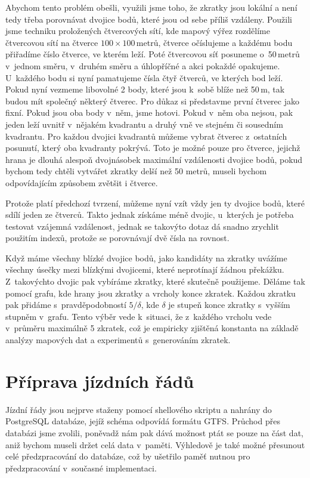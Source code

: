 Abychom tento problém obešli, využili jsme toho, že zkratky jsou lokální a není
tedy třeba porovnávat dvojice bodů, které jsou od sebe příliš vzdáleny. Použili
jsme techniku proložených čtvercových sítí, kde mapový výřez rozdělíme
čtvercovou sítí na čtverce $100\times100$\,metrů, čtverce očíslujeme a každému
bodu přiřadíme číslo čtverce, ve kterém leží. Poté čtvercovou síť posuneme
o~50\,metrů v~jednom směru, v~druhém směru a úhlopříčné a akci pokaždé opakujeme.
U~každého bodu si nyní pamatujeme čísla čtyř čtverců, ve kterých bod leží. 
Pokud nyní vezmeme libovolné 2 body, které jsou k~sobě blíže než 50\,m, tak
budou mít společný některý čtverec. Pro důkaz si představme první čtverec jako
fixní. Pokud jsou oba body v~něm, jsme hotovi. Pokud v~něm oba nejsou, pak jeden
leží uvnitř v~nějakém kvadrantu a druhý vně ve stejném či sousedním kvadrantu.
Pro každou dvojici kvadrantů můžeme vybrat čtverec z~ostatních posunutí, který
oba kvadranty pokrývá. Toto je možné pouze pro čtverce, jejichž hrana je dlouhá
alespoň dvojnásobek maximální vzdálenosti dvojice bodů, pokud bychom tedy chtěli
vytvářet zkratky delší než 50 metrů, museli bychom odpovídajícím způsobem
zvětšit i čtverce.

Protože platí předchozí tvrzení, můžeme nyní vzít vždy jen ty dvojice bodů,
které sdílí jeden ze čtverců. Takto jednak získáme méně dvojic, u~kterých je
potřeba testovat vzájemná vzdálenost, jednak se takovýto dotaz dá snadno
zrychlit použitím indexů, protože se porovnávají dvě čísla na rovnost. 

Když máme všechny blízké dvojice bodů, jako kandidáty na zkratky uvážíme
všechny úsečky mezi blízkými dvojicemi, které neprotínají žádnou překážku.
Z~takovýchto dvojic pak vybíráme zkratky, které skutečně použijeme. Děláme
tak pomocí grafu, kde hrany jsou zkratky a vrcholy konce zkratek. Každou zkratku
pak přidáme s~pravděpodobností $5/\delta$, kde $\delta$ je stupeň konce
zkratky s~vyšším stupněm v~grafu. Tento výběr vede k~situaci, že z~každého
vrcholu vede v~průměru maximálně 5 zkratek, což je empiricky zjištěná konstanta
na základě analýzy mapových dat a experimentů s~generováním zkratek.

\section{Příprava jízdních řádů}
\label{ch:implementace:GTFS}
Jízdní řády jsou nejprve staženy pomocí shellového skriptu a nahrány do
PostgreSQL databáze, jejíž schéma odpovídá formátu GTFS. Průchod přes databázi
jsme zvolili, poněvadž nám pak dává možnost ptát se pouze na část dat,
aniž bychom museli držet celá data v~paměti. Výhledově je také možné přesunout
celé předzpracování do databáze, což by ušetřilo paměť nutnou pro předzpracování
v~současné implementaci.

